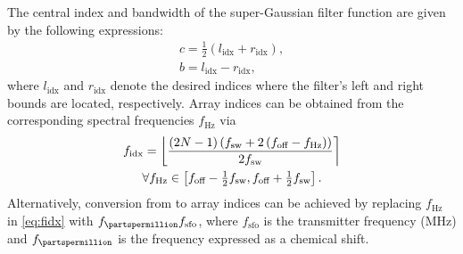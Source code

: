 The central index and bandwidth of the super-Gaussian filter function are given
by the following expressions:
\begin{subequations}
    \begin{gather}
        c = \tfrac{1}{2} \left(l_{\text{idx}} + r_{\text{idx}}\right), \\
        b = l_{\text{idx}} - r_{\text{idx}},
    \end{gather}
\end{subequations}
where $l_{\text{idx}}$ and $r_{\text{idx}}$ denote the desired
indices where the filter's left and right bounds are located, respectively.
Array indices can be obtained from the corresponding spectral frequencies
$f_{\unit{\hertz}}$ via
\begin{equation}
    \begin{gathered}
        f_{\text{idx}} =
            \left \lfloor
                \frac
                {
                    \left(2N - 1\right)
                    \left(\fsw + 2 \left(\foff - f_{\unit{\hertz}}\right) \right)
                }
                {2 \fsw}
            \right \rceil \\
        \forall f_{\unit{\hertz}} \in
            \left[\foff - \tfrac{1}{2} \fsw, \foff + \tfrac{1}{2} \fsw\right].
        \label{eq:fidx}
    \end{gathered}
\end{equation}
Alternatively, conversion from \unit{\partspermillion} to array indices can be
achieved by replacing  $f_{\unit{\hertz}}$ in \cref{eq:fidx} with
$f_{\unit{\partspermillion}} f_{\text{sfo}}$, where $f_{\text{sfo}}$ is the
transmitter frequency (\unit{\mega \hertz}) and $f_{\unit{\partspermillion}}$
is the frequency expressed as a chemical shift.

